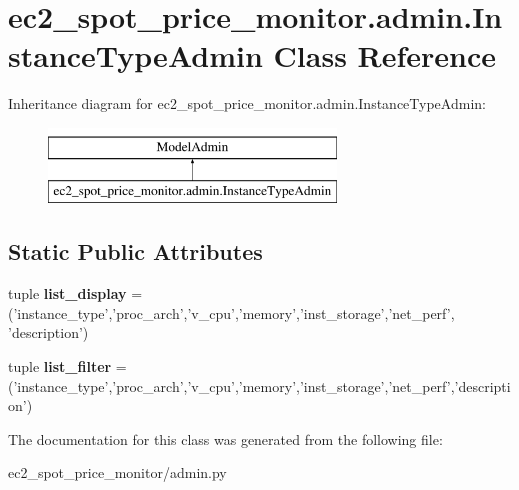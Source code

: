 \hypertarget{classec2__spot__price__monitor_1_1admin_1_1InstanceTypeAdmin}{\section{ec2\-\_\-spot\-\_\-price\-\_\-monitor.\-admin.\-Instance\-Type\-Admin Class Reference}
\label{classec2__spot__price__monitor_1_1admin_1_1InstanceTypeAdmin}
}
Inheritance diagram for ec2\-\_\-spot\-\_\-price\-\_\-monitor.\-admin.\-Instance\-Type\-Admin\-:\begin{figure}[H]
\begin{center}
\leavevmode
\includegraphics[height=2.000000cm]{classec2__spot__price__monitor_1_1admin_1_1InstanceTypeAdmin}
\end{center}
\end{figure}
\subsection*{Static Public Attributes}
\begin{DoxyCompactItemize}
\item 
\hypertarget{classec2__spot__price__monitor_1_1admin_1_1InstanceTypeAdmin_ab8fb973d156851659ee42f3b50bdf581}{tuple {\bfseries list\-\_\-display} = ('instance\-\_\-type','proc\-\_\-arch','v\-\_\-cpu','memory','inst\-\_\-storage','net\-\_\-perf', 'description')}\label{classec2__spot__price__monitor_1_1admin_1_1InstanceTypeAdmin_ab8fb973d156851659ee42f3b50bdf581}

\item 
\hypertarget{classec2__spot__price__monitor_1_1admin_1_1InstanceTypeAdmin_aadfe5fb4762a968428a194f6e7b07cdd}{tuple {\bfseries list\-\_\-filter} = ('instance\-\_\-type','proc\-\_\-arch','v\-\_\-cpu','memory','inst\-\_\-storage','net\-\_\-perf','description')}\label{classec2__spot__price__monitor_1_1admin_1_1InstanceTypeAdmin_aadfe5fb4762a968428a194f6e7b07cdd}

\end{DoxyCompactItemize}


The documentation for this class was generated from the following file\-:\begin{DoxyCompactItemize}
\item 
ec2\-\_\-spot\-\_\-price\-\_\-monitor/admin.\-py\end{DoxyCompactItemize}
